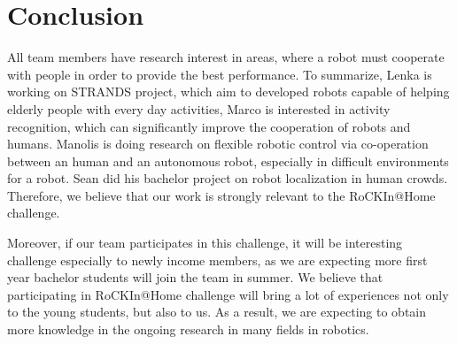 \documentclass[conference]{IEEEtran}
\begin{document}



\section{Conclusion}
All team members have research interest in areas, where a robot must cooperate with people in order to provide the best performance. To summarize, Lenka is working on STRANDS project, which aim to developed robots capable of helping elderly people with every day activities, Marco is interested in activity recognition, which can significantly improve the cooperation of robots and humans. Manolis is doing research on flexible robotic control via co-operation between an human and an autonomous robot, especially in difficult environments for a robot. Sean did his bachelor project on robot localization in human crowds. Therefore, we believe that our work is strongly relevant to the RoCKIn@Home challenge.

Moreover, if our team participates in this challenge, it will be interesting challenge especially to newly income members, as we are expecting more first year bachelor students will join the team in summer. We believe that participating in RoCKIn@Home challenge will bring a lot of experiences not only to the young students, but also to us. As a result, we are expecting to obtain more knowledge in the ongoing research in many fields in robotics.










\end{document}
